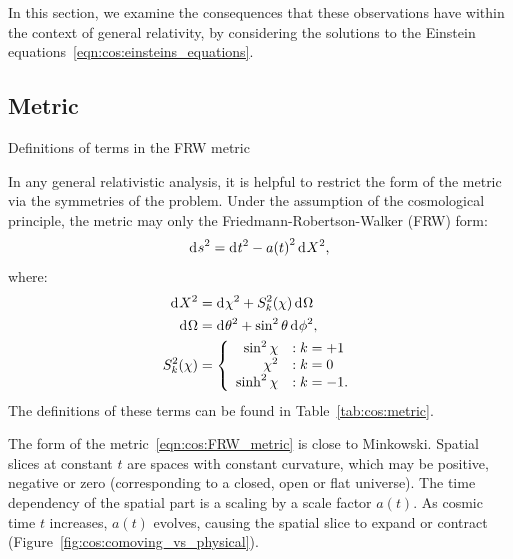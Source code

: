 In this section, we examine the consequences that these observations have within the context of general relativity, by considering the solutions to the Einstein equations~\ref{eqn:cos:einsteins_equations}.

\subsection{Metric}
\begin{table}
  \centering
  
\caption{Definitions of terms in the FRW metric}\label{tab:cos:metric}
\end{table}

In any general relativistic analysis, it is helpful to restrict the form of the metric via the symmetries of the problem.
Under the assumption of the cosmological principle, the metric may only the Friedmann-Robertson-Walker (FRW) form:
\begin{equation}
  \operatorname{d}^{}\!{s}^2 = \operatorname{d}^{}\!{t}^2 - a{(t)}^2 \operatorname{d}^{}\!{X}^2,
  \label{eqn:cos:FRW_metric}
\end{equation}
where:
\begin{align}
  \operatorname{d}^{}\!{X}^2 &= \operatorname{d}^{}\!{\chi}^2 + S_k^2{(\chi)} \operatorname{d}^{}\!{\Omega}
  \label{eqn:cos:space_element}\\
  \operatorname{d}^{}\!{\Omega} &= \operatorname{d}^{}\!{\theta}^2 + \sin^2\theta \operatorname{d}^{}\!{\phi}^2,
  \label{eqn:cos:angle_element}\\
  S_k^2(\chi) &=
  \left\{
  \begin{array}{rl}
    \sin^2\chi &: k=+1 \\
    \chi^2 &: k=0 \\
    \sinh^2\chi &: k=-1. \\
  \end{array}
  \right.\label{eqn:cos:S_def}
\end{align}
The definitions of these terms can be found in Table~\ref{tab:cos:metric}. 

The form of the metric~\eqref{eqn:cos:FRW_metric} is close to Minkowski. Spatial slices at constant $t$ are spaces with constant curvature, which may be positive, negative or zero (corresponding to a closed, open or flat universe). The time dependency of the spatial part is a scaling by a scale factor $a(t)$. As cosmic time $t$ increases, $a(t)$ evolves, causing the spatial slice to expand or contract (Figure~\ref{fig:cos:comoving_vs_physical}). 



